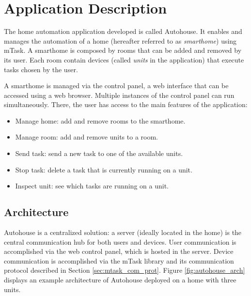 \section{Application Description}\label{sec:app_desc}

The home automation application developed is called Autohouse. It enables and manages the automation of a home (hereafter referred to as \textit{smarthome}) using \gls{mTask}. A smarthome is composed by rooms that can be added and removed by its user. Each room contain devices (called \textit{units} in the application) that execute tasks chosen by the user. 

A smarthome is managed via the control panel, a web interface that can be accessed using a web browser. Multiple instances of the control panel can run simultaneously. There, the user has access to the main features of the application:

\begin{itemize}
    \item Manage home: add and remove rooms to the smarthome.
    \item Manage room: add and remove units to a room.
    \item Send task: send a new task to one of the available units.
    \item Stop task: delete a task that is currently running on a unit.
    \item Inspect unit: see which tasks are running on a unit.
\end{itemize}

\subsection{Architecture}

Autohouse is a centralized solution: a server (ideally located in the home) is the central communication hub for both users and devices. User communication is accomplished via the web control panel, which is hosted in the server. Device communication is accomplished via the \gls{mTask} library and its communication protocol described in Section \ref{sec:mtask_com_prot}. Figure \ref{fig:autohouse_arch} displays an example architecture of Autohouse deployed on a home with three units. 

